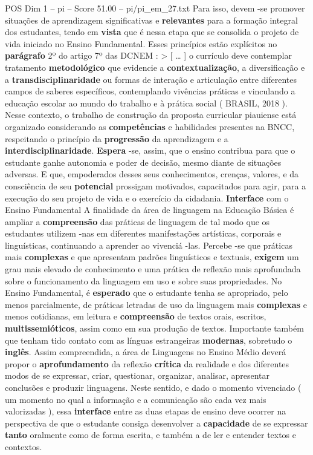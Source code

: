 \begin{textsample}{POS Dim 1 – pi – Score 51.00 – pi/pi\_em\_27.txt}
Para isso, devem -se promover situações de aprendizagem significativas e \textbf{relevantes} para a formação integral dos estudantes, tendo em \textbf{vista} que é nessa etapa que se consolida o projeto de vida iniciado no Ensino Fundamental.
Esses princípios estão explícitos no \textbf{parágrafo} 2º do artigo 7º das DCNEM : > [ … ] o currículo deve contemplar tratamento \textbf{metodológico} que evidencie a \textbf{contextualização}, a diversificação e a \textbf{transdisciplinaridade} ou formas de interação e articulação entre diferentes campos de saberes específicos, contemplando vivências práticas e vinculando a educação escolar ao mundo do trabalho e à prática social ( BRASIL, 2018 ).
Nesse contexto, o trabalho de construção da proposta curricular piauiense está organizado considerando as \textbf{competências} e habilidades presentes na BNCC, respeitando o princípio da \textbf{progressão} da aprendizagem e a \textbf{interdisciplinaridade}. \textbf{Espera} -se, assim, que o ensino contribua para que o estudante ganhe autonomia e poder de decisão, mesmo diante de situações adversas.
E que, empoderados desses seus conhecimentos, crenças, valores, e da consciência de seu \textbf{potencial} prossigam motivados, capacitados para agir, para a execução do seu projeto de vida e o exercício da cidadania. \textbf{Interface} com o Ensino Fundamental A finalidade da área de linguagem na Educação Básica é ampliar a \textbf{compreensão} das práticas de linguagem de tal modo que os estudantes utilizem -nas em diferentes manifestações artísticas, corporais e linguísticas, continuando a aprender ao vivenciá -las.
Percebe -se que práticas mais \textbf{complexas} e que apresentam padrões linguísticos e textuais, \textbf{exigem} um grau mais elevado de conhecimento e uma prática de reflexão mais aprofundada sobre o funcionamento da linguagem em uso e sobre suas propriedades.
No Ensino Fundamental, é \textbf{esperado} que o estudante tenha se apropriado, pelo menos parcialmente, de práticas letradas de uso da linguagem mais \textbf{complexas} e menos cotidianas, em leitura e \textbf{compreensão} de textos orais, escritos, \textbf{multissemióticos}, assim como em sua produção de textos.
Importante também que tenham tido contato com as línguas estrangeiras \textbf{modernas}, sobretudo o \textbf{inglês}.
Assim compreendida, a área de Linguagens no Ensino Médio deverá propor o \textbf{aprofundamento} da reflexão \textbf{crítica} da realidade e dos diferentes modos de se expressar, criar, questionar, organizar, analisar, apresentar conclusões e produzir linguagens.
Neste sentido, e dado o momento vivenciado ( um momento no qual a informação e a comunicação são cada vez mais valorizadas ), essa \textbf{interface} entre as duas etapas de ensino deve ocorrer na perspectiva de que o estudante consiga desenvolver a \textbf{capacidade} de se expressar \textbf{tanto} oralmente como de forma escrita, e também a de ler e entender textos e contextos.

\end{textsample}
